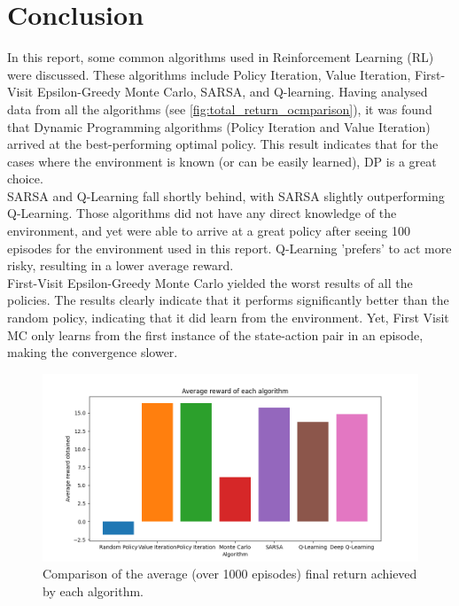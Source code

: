 \documentclass{class}
\begin{document}
\section{Conclusion}
In this report, some common algorithms used in Reinforcement Learning (RL) were discussed. These algorithms include Policy Iteration, Value Iteration, First-Visit Epsilon-Greedy Monte Carlo, SARSA, and Q-learning. Having analysed data from all the algorithms (see \autoref{fig:total_return_ocmparison}), it was found that Dynamic Programming algorithms (Policy Iteration and Value Iteration) arrived at the best-performing optimal policy. This result indicates that for the cases where the environment is known (or can be easily learned), DP is a great choice.
\\[0.3cm]
SARSA and Q-Learning fall shortly behind, with SARSA slightly outperforming Q-Learning. Those algorithms did not have any direct knowledge of the environment, and yet were able to arrive at a great policy after seeing 100 episodes for the environment used in this report. Q-Learning 'prefers' to act more risky, resulting in a lower average reward.
\\[0.3cm]
First-Visit Epsilon-Greedy Monte Carlo yielded the worst results of all the policies. The results clearly indicate that it performs significantly better than the random policy, indicating that it did learn from the environment. Yet, First Visit MC only learns from the first instance of the state-action pair in an episode, making the convergence slower.

\begin{figure}[H]
    \centering
    \includegraphics[width=0.5\linewidth]{../plots/comparison/total_return_comparison.png}
    \caption{Comparison of the average (over 1000 episodes) final return achieved by each algorithm.}
    \label{fig:total_return_ocmparison}
\end{figure}


\printbibliography[title={References}]
\end{document}

